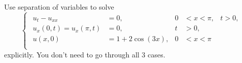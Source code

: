 \documentclass[plain]{pset}
\begin{document}
\pagebreak

\begin{problem}
Use separation of variables to solve
\[
    \begin{cases}
        \begin{aligned}
            u_t - u_{xx}            & = 0,             & 0 & < x < \pi, & t > 0, \\
            u_x(0, t) = u_x(\pi, t) & = 0,             & t & > 0,                \\
            u(x, 0)                 & = 1 + 2\cos(3x), & 0 & < x < \pi           \\
        \end{aligned}
    \end{cases}
\]
explicitly. You don't need to go through all 3 cases.
\end{problem}
\end{document}

